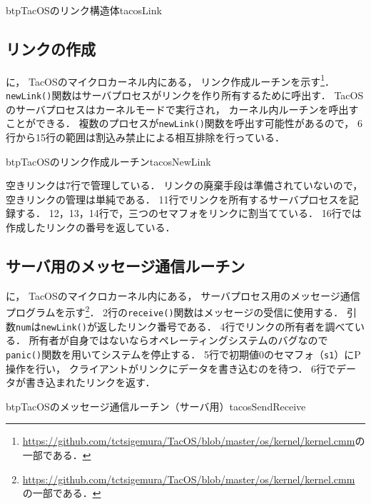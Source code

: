 \begin{myfig}{btp}{TacOSのリンク構造体}{tacosLink}

\end{myfig}

\subsection{リンクの作成}
に，
TacOSのマイクロカーネル内にある，
リンク作成ルーチンを示す\footnote{
\url{https://github.com/tctsigemura/TacOS/blob/master/os/kernel/kernel.cmm}の
一部である．}．
{\tt newLink()}関数はサーバプロセスがリンクを作り所有するために呼出す．
TacOSのサーバプロセスはカーネルモードで実行され，
カーネル内ルーチンを呼出すことができる．
複数のプロセスが{\tt newLink()}関数を呼出す可能性があるので，
6行から15行の範囲は割込み禁止による相互排除を行っている．

\begin{myfig}{btp}{TacOSのリンク作成ルーチン}{tacosNewLink}

\end{myfig}

空きリンクは7行で管理している．
リンクの廃棄手段は準備されていないので，
空きリンクの管理は単純である．
11行でリンクを所有するサーバプロセスを記録する．
12，13，14行で，三つのセマフォをリンクに割当てている．
16行では作成したリンクの番号を返している．

\subsection{サーバ用のメッセージ通信ルーチン}
に，
TacOSのマイクロカーネル内にある，
サーバプロセス用のメッセージ通信プログラムを示す\footnote{
\url{https://github.com/tctsigemura/TacOS/blob/master/os/kernel/kernel.cmm}
の一部である．}．
2行の{\tt receive()}関数はメッセージの受信に使用する．
引数{\tt num}は{\tt newLink()}が返したリンク番号である．
4行でリンクの所有者を調べている．
所有者が自身ではないならオペレーティングシステムのバグなので
{\tt panic()}関数を用いてシステムを停止する．
5行で初期値0のセマフォ（{\tt s1}）にP操作を行い，
クライアントがリンクにデータを書き込むのを待つ．
6行でデータが書き込まれたリンクを返す．

\begin{myfig}{btp}{TacOSのメッセージ通信ルーチン（サーバ用）}{tacosSendReceive}

\end{myfig}

